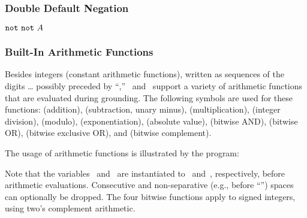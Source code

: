 \subsubsection{Double Default Negation}\label{subsec:gringo:double}


 $\texttt{not}~\texttt{not}~A$

\subsubsection{Built-In Arithmetic Functions}\label{subsec:gringo:arith}

Besides integers (constant arithmetic functions),
written as sequences of the digits \dots{}
possibly preceded by ``\code{-},''
\gringo\ and \clingo\ support a variety of arithmetic functions that
are evaluated during grounding.
The following symbols are used for these functions:
\code{+} (addition),
\code{-} (subtraction, unary minus),
\code{*} (multiplication),
\code{/} (integer division),
\code{\textbackslash} (modulo),
\code{**} (exponentiation),
\code{|$\cdot$|} (absolute value),
\code{\&} (bitwise AND),
 (bitwise OR),
\code{\^} (bitwise exclusive OR), and
\code{\textasciitilde} (bitwise complement).

\begin{example}\label{ex:arith:fun}
The usage of arithmetic functions is illustrated by the program:%
%

%
Note that the variables~ and~ are instantiated to~ and~,
respectively, before arithmetic evaluations.
Consecutive and non-separative (e.g., before ``\code{(}'')
spaces can optionally be dropped.
The four bitwise functions apply to signed integers,
using two's complement arithmetic. %
\eexample
\end{example}

